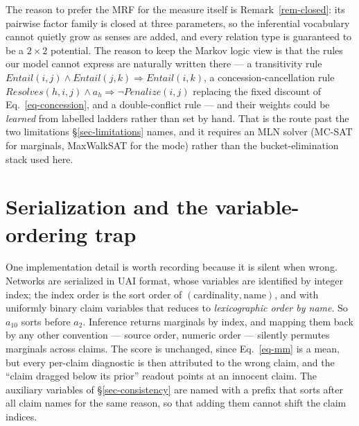 The reason to prefer the MRF for the measure itself is Remark~\ref{rem-closed}: its pairwise factor
family is closed at three parameters, so the inferential vocabulary cannot quietly grow as senses are
added, and every relation type is guaranteed to be a $2\times2$ potential. The reason to keep the
Markov logic view is that the rules our model cannot express are naturally written there --- a
transitivity rule $\mathit{Entail}(i,j)\wedge\mathit{Entail}(j,k)\Rightarrow\mathit{Entail}(i,k)$, a
concession-cancellation rule $\mathit{Resolves}(h,i,j)\wedge a_h \Rightarrow \neg\mathit{Penalize}(i,j)$
replacing the fixed discount of Eq.~\ref{eq-concession}, and a double-conflict rule --- and their
weights could be \emph{learned} from labelled ladders rather than set by hand. That is the route past
the two limitations \S\ref{sec-limitations} names, and it requires an MLN solver (MC-SAT for marginals,
MaxWalkSAT for the mode) rather than the bucket-elimination stack used here.

\section{Serialization and the variable-ordering trap}
\label{app-uai}

One implementation detail is worth recording because it is silent when wrong. Networks are serialized in
UAI format, whose variables are identified by integer index; the index order is the sort order of
$(\text{cardinality},\text{name})$, and with uniformly binary claim variables that reduces to
\emph{lexicographic order by name}. So $a_{10}$ sorts before $a_2$. Inference returns marginals by
index, and mapping them back by any other convention --- source order, numeric order --- silently
permutes marginals across claims. The score is unchanged, since Eq.~\ref{eq-mm} is a mean, but every
per-claim diagnostic is then attributed to the wrong claim, and the ``claim dragged below its prior''
readout points at an innocent claim. The auxiliary variables of \S\ref{sec-consistency} are named with a
prefix that sorts after all claim names for the same reason, so that adding them cannot shift the claim
indices.


